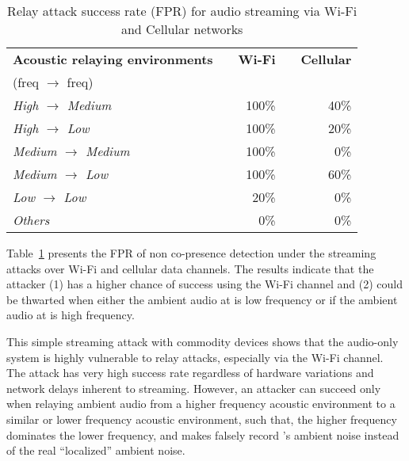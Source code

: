 \begin{table}[htbp]
\centering
	\scriptsize
    \caption{Relay attack success rate (FPR) for audio streaming via Wi-Fi and
    Cellular networks} 
    \label{tbl:audio-streaming}

    \begin{tabular}{@{}lcrcr@{}}
        \toprule
        {\bf Acoustic relaying environments} &\phantom{} & {\bf Wi-Fi} &\phantom{} & {\bf Cellular} \\
	(\prover  freq $\rightarrow$ \verifier  freq) &\phantom{} & {} &\phantom{} & {} \\
        \midrule
        {\em High $\rightarrow$ Medium} && 100\% && 40\% \\
        {\em High $\rightarrow$ Low} && 100\% && 20\% \\
        {\em Medium $\rightarrow$ Medium} && 100\% && 0\% \\
        {\em Medium $\rightarrow$ Low} && 100\% && 60\% \\
        {\em Low $\rightarrow$ Low} && 20\% && 0\% \\
        {\em Others}                && 0\%  && 0\% \\ 
        \bottomrule
    \end{tabular}
\end{table}



 Table~\ref{tbl:audio-streaming} presents the FPR of non co-presence detection
under the streaming attacks over Wi-Fi and cellular data channels. The results
indicate that the attacker (1) has a higher chance of success using the Wi-Fi
channel and (2) could be thwarted when either the ambient audio at \prover is low
frequency or if the ambient audio at \verifier is high frequency.







This simple streaming attack with commodity devices shows that the
audio-only system is highly vulnerable to relay attacks, especially via the
Wi-Fi channel. The attack has very high success rate regardless of hardware
variations and network delays inherent to streaming. However, an attacker can
succeed only when relaying ambient audio from a higher frequency acoustic
environment to a similar or lower frequency acoustic environment, such that,
the higher frequency dominates the lower frequency, and makes \verifier falsely
record \prover's ambient noise instead of the real ``localized'' ambient noise. 


